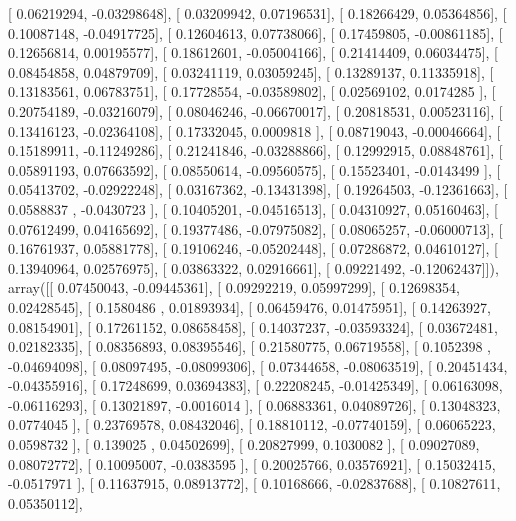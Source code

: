 \documentclass{article}
\begin{document}
       [ 0.06219294, -0.03298648],
       [ 0.03209942,  0.07196531],
       [ 0.18266429,  0.05364856],
       [ 0.10087148, -0.04917725],
       [ 0.12604613,  0.07738066],
       [ 0.17459805, -0.00861185],
       [ 0.12656814,  0.00195577],
       [ 0.18612601, -0.05004166],
       [ 0.21414409,  0.06034475],
       [ 0.08454858,  0.04879709],
       [ 0.03241119,  0.03059245],
       [ 0.13289137,  0.11335918],
       [ 0.13183561,  0.06783751],
       [ 0.17728554, -0.03589802],
       [ 0.02569102,  0.0174285 ],
       [ 0.20754189, -0.03216079],
       [ 0.08046246, -0.06670017],
       [ 0.20818531,  0.00523116],
       [ 0.13416123, -0.02364108],
       [ 0.17332045,  0.0009818 ],
       [ 0.08719043, -0.00046664],
       [ 0.15189911, -0.11249286],
       [ 0.21241846, -0.03288866],
       [ 0.12992915,  0.08848761],
       [ 0.05891193,  0.07663592],
       [ 0.08550614, -0.09560575],
       [ 0.15523401, -0.0143499 ],
       [ 0.05413702, -0.02922248],
       [ 0.03167362, -0.13431398],
       [ 0.19264503, -0.12361663],
       [ 0.0588837 , -0.0430723 ],
       [ 0.10405201, -0.04516513],
       [ 0.04310927,  0.05160463],
       [ 0.07612499,  0.04165692],
       [ 0.19377486, -0.07975082],
       [ 0.08065257, -0.06000713],
       [ 0.16761937,  0.05881778],
       [ 0.19106246, -0.05202448],
       [ 0.07286872,  0.04610127],
       [ 0.13940964,  0.02576975],
       [ 0.03863322,  0.02916661],
       [ 0.09221492, -0.12062437]]), array([[ 0.07450043, -0.09445361],
       [ 0.09292219,  0.05997299],
       [ 0.12698354,  0.02428545],
       [ 0.1580486 ,  0.01893934],
       [ 0.06459476,  0.01475951],
       [ 0.14263927,  0.08154901],
       [ 0.17261152,  0.08658458],
       [ 0.14037237, -0.03593324],
       [ 0.03672481,  0.02182335],
       [ 0.08356893,  0.08395546],
       [ 0.21580775,  0.06719558],
       [ 0.1052398 , -0.04694098],
       [ 0.08097495, -0.08099306],
       [ 0.07344658, -0.08063519],
       [ 0.20451434, -0.04355916],
       [ 0.17248699,  0.03694383],
       [ 0.22208245, -0.01425349],
       [ 0.06163098, -0.06116293],
       [ 0.13021897, -0.0016014 ],
       [ 0.06883361,  0.04089726],
       [ 0.13048323,  0.0774045 ],
       [ 0.23769578,  0.08432046],
       [ 0.18810112, -0.07740159],
       [ 0.06065223,  0.0598732 ],
       [ 0.139025  ,  0.04502699],
       [ 0.20827999,  0.1030082 ],
       [ 0.09027089,  0.08072772],
       [ 0.10095007, -0.0383595 ],
       [ 0.20025766,  0.03576921],
       [ 0.15032415, -0.0517971 ],
       [ 0.11637915,  0.08913772],
       [ 0.10168666, -0.02837688],
       [ 0.10827611,  0.05350112],
\end{document}

